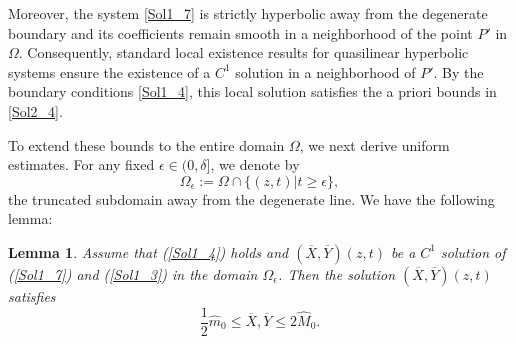 \documentclass[3p,11pt]{elsarticle}
\numberwithin{equation}{section}
\newtheorem{lemma}{Lemma}[section]
\begin{document}
Moreover, the system \eqref{Sol1_7} is strictly hyperbolic away from the degenerate boundary and its coefficients remain smooth in a neighborhood of the point $P'$ in $\Omega$. Consequently, standard local existence results for quasilinear hyperbolic systems \cite{liboundaryvalue} ensure the existence of a $C^1$ solution in a neighborhood of $P'$. By the boundary conditions \eqref{Sol1_4}, this local solution satisfies the a priori bounds in \eqref{Sol2_4}.

To extend these bounds to the entire domain $\Omega$, we next derive uniform estimates. For any fixed $\epsilon\in(0,\delta]$, we denote by
\begin{equation*}
    \Omega_\epsilon:=\Omega \cap \{(z,t)|t\geq \epsilon\},
\end{equation*}
the truncated subdomain away from the degenerate line. We have the following lemma:
\begin{lemma}\label{Sol_3_l1}
     Assume that (\ref{Sol1_4}) holds and $(\overline{X},\overline{ Y})(z,t)$ be a $C^1$ solution of (\ref{Sol1_7}) and (\ref{Sol1_3}) in the domain $\Omega_\epsilon$. Then the solution $(\overline{X},\overline{ Y})(z,t)$ satisfies
     \begin{equation}\label{l11}
       \frac{1}{2}\hat{m}_0 \leq \overline{X}, \overline{Y} \leq 2\hat{M}_0.
     \end{equation}
\end{lemma}
\end{document}
